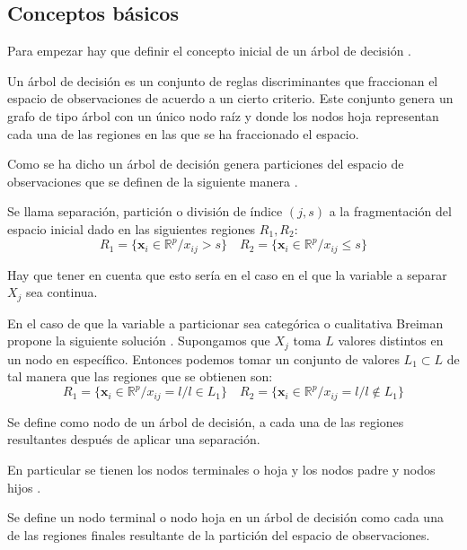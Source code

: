 \subsection{Conceptos básicos}
\noindent Para empezar hay que definir el concepto inicial de un árbol de decisión \cite{Hastie 2001}.
\begin{defi}
Un árbol de decisión es un conjunto de reglas discriminantes que fraccionan el espacio de observaciones de acuerdo a un cierto criterio. Este conjunto genera un grafo de tipo árbol con un único nodo raíz  y donde los nodos hoja representan cada una de las regiones en las que se ha fraccionado el espacio. 
\end{defi}
\noindent Como se ha dicho un árbol de decisión genera particiones del espacio de observaciones que se definen de la siguiente manera \cite{Brown 2004}.
\begin{defi}
Se llama separación, partición o división de índice $(j,s)$ a la fragmentación del espacio inicial dado en las siguientes regiones $R_1,R_2$:
\begin{equation}
R_1=\lbrace \mathbf{x}_i \in \mathbb{R}^p/ x_{ij}>s\rbrace \quad R_2=\lbrace \mathbf{x}_i \in \mathbb{R}^p/ x_{ij}\leq s\rbrace
\end{equation}

\noindent Hay que tener en cuenta que esto sería en el caso en el que la variable a separar $X_j$ sea continua.

\noindent En el caso de que la variable a particionar sea categórica o cualitativa Breiman propone la siguiente solución \cite{Breiman 1984}. Supongamos que $X_j$ toma $L$ valores distintos en un nodo en específico. Entonces podemos tomar un conjunto de valores $L_1\subset L$ de tal manera que las regiones que se obtienen son:
\begin{equation}
R_1=\lbrace \mathbf{x}_i \in \mathbb{R}^p/ x_{ij}=l/ l\in L_1\rbrace \quad R_2=\lbrace \mathbf{x}_i \in \mathbb{R}^p/ x_{ij}=l/ l\notin L_1\rbrace
\end{equation}
\end{defi}
\begin{defi}
Se define como nodo de un árbol de decisión, a cada una de las regiones resultantes después de aplicar una separación.
\end{defi}
\noindent En particular se tienen los nodos terminales o hoja y los nodos padre y nodos hijos \cite{Brown 2004}.
\begin{defi}
Se define un nodo terminal o nodo hoja en un árbol de decisión como cada una de las regiones finales resultante de la partición del espacio de observaciones.
\end{defi}
